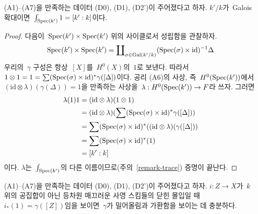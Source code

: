 \begin{lemma}
\label{lemma-integrate-1}
(A1)--(A7)을 만족하는 데이터 (D0), (D1), (D2')이 주어졌다고 하자.
$k'/k$가\  Galois 확대이면\ 
$\int_{\mathop{\mathrm{Spec}}(k')} 1 = [k' : k]$이다.
\end{lemma}

\begin{proof}
다음이\  $\mathop{\mathrm{Spec}}(k') \times \mathop{\mathrm{Spec}}(k')$ 위의 사이클로서 성립함을
관찰하자.
$$
\mathop{\mathrm{Spec}}(k') \times \mathop{\mathrm{Spec}}(k') =
\coprod\nolimits_{\sigma \in \text{Gal}(k'/k)}
(\mathop{\mathrm{Spec}}(\sigma) \times \text{id})^{-1} \Delta
$$
우리의\  $\gamma$ 구성은 항상\  $[X]$를\  $H^0(X)$의\  $1$로 보낸다.
따라서\ 
$1 \otimes 1 = 1 = \sum (\mathop{\mathrm{Spec}}(\sigma) \times \text{id})^*\gamma([\Delta])$이다.
공리 (A6)의 사상, 즉\  $H^0(\mathop{\mathrm{Spec}}(k'))$에서\ 
$(\text{id} \otimes \lambda)(\gamma(\Delta)) = 1$을 만족하는 사상을\ 
$\lambda : H^0(\mathop{\mathrm{Spec}}(k')) \to F$라 쓰자. 그러면
\begin{align*}
\lambda(1) 1
& =
(\text{id} \otimes \lambda)(1 \otimes 1) \\
& =
(\text{id} \otimes \lambda)(
\sum (\mathop{\mathrm{Spec}}(\sigma) \times \text{id})^*\gamma([\Delta])) \\
& =
\sum (\mathop{\mathrm{Spec}}(\sigma) \times \text{id})^*(
(\text{id} \otimes \lambda)(\gamma([\Delta])) \\
& =
\sum (\mathop{\mathrm{Spec}}(\sigma) \times \text{id})^*(1) \\
& =
[k' : k]
\end{align*}
이다. $\lambda$는\  $\int_{\mathop{\mathrm{Spec}}(k')}$의 다른 이름이므로(주의\ 
\ref{remark-trace}) 증명이 끝난다.
\end{proof}

\begin{lemma}
\label{lemma-enough}
(A1)--(A7)을 만족하는 데이터 (D0), (D1), (D2')이 주어졌다고 하자.
$i : Z \to X$가\  $k$ 위의 공집합이 아닌 등차원 매끄러운 사영
스킴들의 닫힌 몰입일 때\  $i_*(1) = \gamma([Z])$임을 보이면\ 
$\gamma$가 밀어올림과 가환함을 보이는 데 충분하다.
\end{lemma}

